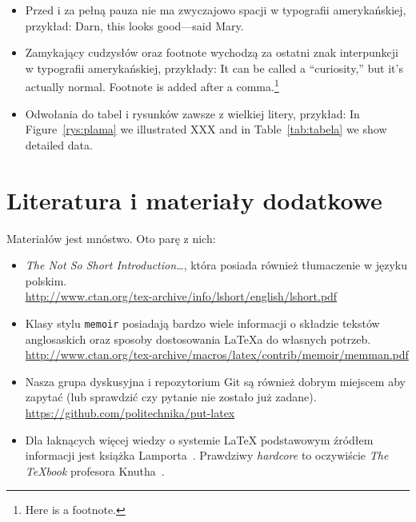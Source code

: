 \begin{itemize}
\item Przed i za pełną pauza nie ma zwyczajowo spacji w typografii amerykańskiej, przykład:
  Darn, this looks good---said Mary.

\item Zamykający cudzysłów oraz footnote wychodzą za ostatni znak interpunkcji w typografii 
  amerykańskiej, przykłady:
  It can be called a ``curiosity,'' but it's actually normal.
  Footnote is added after a comma.\footnote{Here is a footnote.}

\item Odwołania do tabel i rysunków zawsze z wielkiej litery, przykład:
  In Figure~\ref{rys:plama} we illustrated XXX and in Table~\ref{tab:tabela} we show detailed data.
  
\end{itemize}


\section{Literatura i materiały dodatkowe}

Materiałów jest mnóstwo. Oto parę z nich:
\begin{itemize}
    \item \emph{The Not So Short Introduction\ldots}, która posiada również tłumaczenie 
    w języku polskim.\\
    \url{http://www.ctan.org/tex-archive/info/lshort/english/lshort.pdf}

    \item Klasy stylu \texttt{memoir} posiadają bardzo wiele informacji o składzie tekstów
    anglosaskich oraz sposoby dostosowania \LaTeX{}a do własnych potrzeb.\\
    \url{http://www.ctan.org/tex-archive/macros/latex/contrib/memoir/memman.pdf}
    
    \item Nasza grupa dyskusyjna i repozytorium Git są również dobrym miejscem aby zapytać
    (lub sprawdzić czy pytanie nie zostało już zadane).\\
    \url{https://github.com/politechnika/put-latex}

    \item Dla łaknących więcej wiedzy o systemie LaTeX podstawowym źródłem informacji
    jest książka Lamporta~\cite{Lamport1985}. Prawdziwy \emph{hardcore} to oczywiście
    \emph{The \TeX{}book} profesora Knutha~\cite{Knuth1986}.
\end{itemize}

